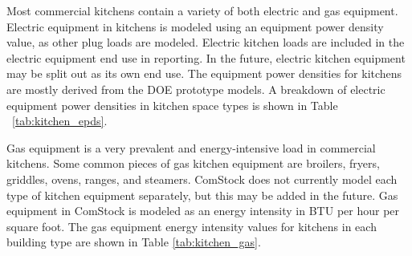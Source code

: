 Most commercial kitchens contain a variety of both electric and gas equipment. Electric equipment in kitchens is modeled using an equipment power density value, as other plug loads are modeled. Electric kitchen loads are included in the electric equipment end use in reporting. In the future, electric kitchen equipment may be split out as its own end use. The equipment power densities for kitchens are mostly derived from the DOE prototype models. A breakdown of electric equipment power densities in kitchen space types is shown in Table ~\ref{tab:kitchen_epds}.

Gas equipment is a very prevalent and energy-intensive load in commercial kitchens. Some common pieces of gas kitchen equipment are broilers, fryers, griddles, ovens, ranges, and steamers. ComStock does not currently model each type of kitchen equipment separately, but this may be added in the future. Gas equipment in ComStock is modeled as an energy intensity in BTU per hour per square foot. The gas equipment energy intensity values for kitchens in each building type are shown in Table \ref{tab:kitchen_gas}. 





 